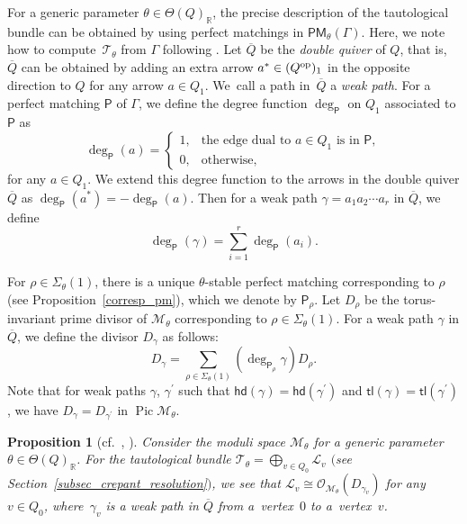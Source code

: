 \documentclass[10pt,a4paper]{amsart}
\numberwithin{equation}{section}
\newtheorem{Proposition}[Theorem]{Proposition}
\theoremstyle{definition}
\newcommand{\RR}{\mathbb{R}}
\newcommand{\calL}{\mathcal{L}}
\newcommand{\calM}{\mathcal{M}}
\newcommand{\calO}{\mathcal{O}}
\newcommand{\calT}{\mathcal{T}}
\newcommand{\sfP}{\mathsf{P}}
\newcommand{\Pic}{\operatorname{Pic}}
\newcommand{\hd}{\mathsf{hd}}
\newcommand{\tl}{\mathsf{tl}}
\newcommand{\PM}{\mathsf{PM}}
\begin{document}
For a generic parameter $\theta\in\Theta(Q)_\RR$, the precise description of the tautological bundle \smash{$\calT_\theta=\bigoplus_{v\in Q_0}\calL_v$}
can be obtained by using perfect matchings in $\PM_\theta(\Gamma)$.
Here, we note how to compute~$\calT_\theta$ from $\Gamma$ following \cite[Section~2.5]{BCQV_recipe}.
Let $\overline{Q}$ be the \emph{double quiver} of $Q$, that is, $\overline{Q}$ can be obtained by adding an extra arrow $a^\ast\in (Q^{\rm op})_1$
in the opposite direction to $Q$ for any arrow $a\in Q_1$. We~call a path in~$\overline{Q}$ a \emph{weak path}.
For a perfect matching $\sfP$ of $\Gamma$, we define the degree function $\deg_\sfP$ on $Q_1$ associated to $\sfP$ as
\begin{equation*}%
\deg_\sfP(a)=
\begin{cases}
1, & \text{the edge dual to $a\in Q_1$ is in $\sfP$},\\
0, & \text{otherwise},
\end{cases}
\end{equation*}
for any $a\in Q_1$.
We extend this degree function to the arrows in the double quiver $\overline{Q}$ as $\deg_\sfP(a^\ast)=-\deg_\sfP(a)$.
Then for a weak path $\gamma=a_1a_2\cdots a_r$ in $\overline{Q}$, we define
\[
\deg_\sfP(\gamma)=\sum_{i=1}^r\deg_\sfP(a_i).
\]

For $\rho\in\Sigma_\theta(1)$, there is a unique $\theta$-stable perfect matching corresponding to $\rho$ (see Proposition~\ref{corresp_pm}),
which we denote by $\sfP_\rho$.
Let $D_\rho$ be the torus-invariant prime divisor of $\calM_\theta$ corresponding to $\rho\in\Sigma_\theta(1)$.
For a weak path $\gamma$ in $\overline{Q}$, we define the divisor $D_\gamma$ as follows:
\[
D_\gamma=\sum_{\rho\in \Sigma_\theta(1)}(\deg_{\sfP_\rho} \gamma)D_\rho.
\]
Note that for weak paths $\gamma$, $\gamma^\prime$ such that $\hd(\gamma)=\hd(\gamma^\prime)$ and $\tl(\gamma)=\tl(\gamma^\prime)$,
we have $D_\gamma=D_{\gamma^\prime}$ in $\Pic\calM_\theta$.

\begin{Proposition}[{cf.\ \cite[Theorem~4.2]{BM_crepant}, \cite[Lemma~2.10]{BCQV_recipe}}]\label{prop_compute_tautological}
Consider the moduli space $\calM_\theta$ for a generic parameter $\theta\in\Theta(Q)_\RR$.
For the tautological bundle $\calT_\theta= \bigoplus_{v\in Q_0}\calL_v$ $($see Section~{\rm \ref{subsec_crepant_resolution}}$)$,
we see that $\calL_v \cong \calO_{\calM_\theta}(D_{\gamma_v})$ for any $v\in Q_0$, where~$\gamma_v$ is a weak path in $\overline{Q}$ from a~vertex~$0$ to a~vertex~$v$.
\end{Proposition}
\end{document}

